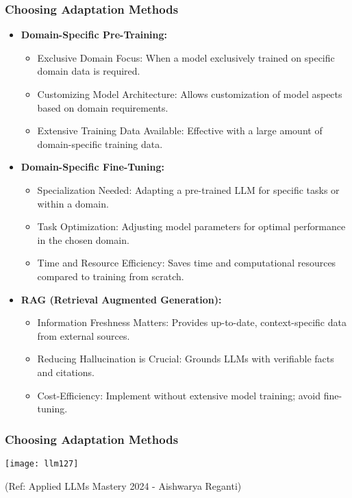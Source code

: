 \begin{frame}[fragile]\frametitle{Choosing Adaptation Methods}
  \begin{itemize}
    \item \textbf{Domain-Specific Pre-Training:}
      \begin{itemize}
        \item Exclusive Domain Focus: When a model exclusively trained on specific domain data is required.
        \item Customizing Model Architecture: Allows customization of model aspects based on domain requirements.
        \item Extensive Training Data Available: Effective with a large amount of domain-specific training data.
      \end{itemize}
    \item \textbf{Domain-Specific Fine-Tuning:}
      \begin{itemize}
        \item Specialization Needed: Adapting a pre-trained LLM for specific tasks or within a domain.
        \item Task Optimization: Adjusting model parameters for optimal performance in the chosen domain.
        \item Time and Resource Efficiency: Saves time and computational resources compared to training from scratch.
      \end{itemize}
    \item \textbf{RAG (Retrieval Augmented Generation):}
      \begin{itemize}
        \item Information Freshness Matters: Provides up-to-date, context-specific data from external sources.
        \item Reducing Hallucination is Crucial: Grounds LLMs with verifiable facts and citations.
        \item Cost-Efficiency: Implement without extensive model training; avoid fine-tuning.
      \end{itemize}
  \end{itemize}
\end{frame}

\begin{frame}[fragile]\frametitle{Choosing Adaptation Methods}

\begin{center}
\texttt{[image: llm127]}
\end{center}				

{\tiny (Ref: Applied LLMs Mastery 2024 - Aishwarya Reganti)}

\end{frame}

